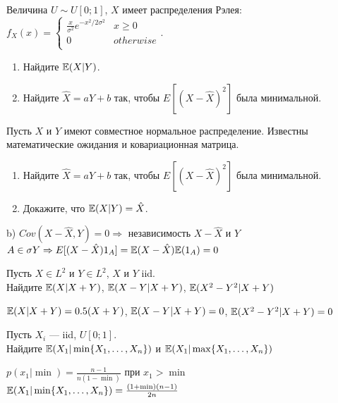 \begin{problem}
Величина $U\sim U[0;1]$, $X$ имеет распределения Рэлея: \\
$f_{X}(x)=
\begin{cases}
  \frac{x}{\sigma^{2}}e^{-x^{2}/2\sigma^{2}} & x\ge 0 \\
  0 & otherwise \\
\end{cases}$.
\begin{enumerate}
\item Найдите $\mathbb{E}(X|Y)$.
\item Найдите $\hat{X}=aY+b$ так, чтобы $E[(X-\hat{X})^{2}]$ была
минимальной.
\end{enumerate}

\begin{sol}

\end{sol}
\end{problem}

\begin{problem}
Пусть $X$ и $Y$ имеют совместное нормальное распределение.
Известны математические ожидания и ковариационная матрица.
\begin{enumerate}
\item  Найдите $\hat{X}=aY+b$ так, чтобы $E[(X-\hat{X})^{2}]$ была
минимальной.
\item Докажите, что $\mathbb{E}(X|Y)=\hat{X}$.
\end{enumerate}

\begin{sol}


b) $Cov(X-\hat{X},Y)=0 \Rightarrow $ независимость $X-\hat{X}$ и
$Y$ \\
$A\in\sigma{Y} \Rightarrow
E[(X-\hat{X})1_{A}]=\mathbb{E}(X-\hat{X})\mathbb{E}(1_{A})=0$
\end{sol}
\end{problem}

\begin{problem}
Пусть $X\in L^{2}$ и $Y\in L^{2}$, $X$ и $Y$ iid. \\
Найдите $\mathbb{E}(X|X+Y)$, $\mathbb{E}(X-Y|X+Y)$, $\mathbb{E}(X^{2}-Y^{2}|X+Y)$

\begin{sol}

$\mathbb{E}(X|X+Y)=0.5(X+Y)$, $\mathbb{E}(X-Y|X+Y)=0$, $\mathbb{E}(X^{2}-Y^{2}|X+Y)=0$
\end{sol}
\end{problem}

\begin{problem}
Пусть $X_{i}$ — iid, $U[0;1]$. \\
Найдите $\mathbb{E}(X_{1}|\min\{X_{1},\ldots,X_{n}\})$ и
$\mathbb{E}(X_{1}|\max\{X_{1},\ldots,X_{n}\})$

\begin{sol}

$p(x_{1}|\min)=\frac{n-1}{n(1-\min)}$ при $x_{1}>\min$ \\
$\mathbb{E}(X_{1}|\min\{X_{1},\ldots,X_{n}\})=\frac{(1+\min)(n-1)}{2n}$
\end{sol}
\end{problem}

